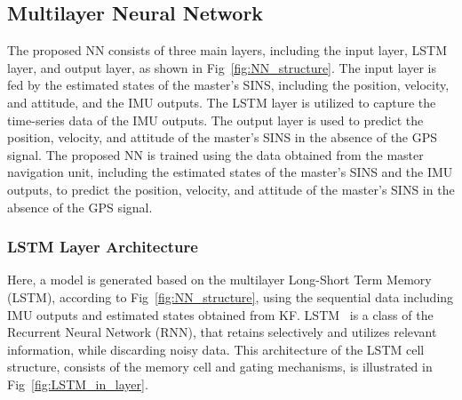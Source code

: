 \documentclass[3p]{elsarticle}
\begin{document}
\subsection{Multilayer Neural Network}
\noindent The proposed NN consists of three main layers, including the input layer, LSTM layer, and output layer, as shown in Fig~\ref{fig:NN_structure}.
The input layer is fed by the estimated states of the master's SINS, including the position, velocity, and attitude, and the IMU outputs.
The LSTM layer is utilized to capture the time-series data of the IMU outputs.
The output layer is used to predict the position, velocity, and attitude of the master's SINS in the absence of the GPS signal.
The proposed NN is trained using the data obtained from the master navigation unit, including the estimated states of the master's SINS and the IMU outputs, to predict the position, velocity, and attitude of the master's SINS in the absence of the GPS signal.

\subsubsection{LSTM Layer Architecture}
\noindent Here, a model is generated based on the multilayer Long-Short Term Memory (LSTM), according to Fig~\ref{fig:NN_structure}, using the sequential data including IMU outputs and estimated states obtained from KF\@.
LSTM~\cite{LSTM} is a class of the Recurrent Neural Network (RNN), that retains selectively and utilizes relevant information, while discarding noisy data. This architecture of the LSTM cell structure, consists of the memory cell and gating mechanisms, is illustrated in Fig~\ref{fig:LSTM_in_layer}.

\end{document}
